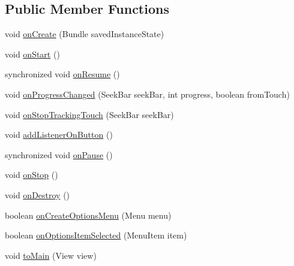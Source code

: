 \subsection*{Public Member Functions}
\begin{DoxyCompactItemize}
\item 
void \hyperlink{classcom_1_1example_1_1android_1_1_bluetooth_chat_1_1_l_a_s_a_r_control_a85e87cb5ced88dff7c8173ecc4f636d1}{on\-Create} (Bundle saved\-Instance\-State)
\item 
void \hyperlink{classcom_1_1example_1_1android_1_1_bluetooth_chat_1_1_l_a_s_a_r_control_a11bcf4e3177fdb549350a4aa149e9e67}{on\-Start} ()
\item 
synchronized void \hyperlink{classcom_1_1example_1_1android_1_1_bluetooth_chat_1_1_l_a_s_a_r_control_a45b78fc913c5af291d89fd7e5a8aa601}{on\-Resume} ()
\item 
void \hyperlink{classcom_1_1example_1_1android_1_1_bluetooth_chat_1_1_l_a_s_a_r_control_ac98847d21be8b44457423bb004e2e655}{on\-Progress\-Changed} (Seek\-Bar seek\-Bar, int progress, boolean from\-Touch)
\item 
void \hyperlink{classcom_1_1example_1_1android_1_1_bluetooth_chat_1_1_l_a_s_a_r_control_abb13b75125cb8cb24fbeeef2451e262c}{on\-Stop\-Tracking\-Touch} (Seek\-Bar seek\-Bar)
\item 
void \hyperlink{classcom_1_1example_1_1android_1_1_bluetooth_chat_1_1_l_a_s_a_r_control_ae52c93cc72458772ce286f19d7cb6760}{add\-Listener\-On\-Button} ()
\item 
synchronized void \hyperlink{classcom_1_1example_1_1android_1_1_bluetooth_chat_1_1_l_a_s_a_r_control_a0e46f04a72924962b5bdb1e5aff7ddc4}{on\-Pause} ()
\item 
void \hyperlink{classcom_1_1example_1_1android_1_1_bluetooth_chat_1_1_l_a_s_a_r_control_a458397229d0b2076a739955b1cb8be35}{on\-Stop} ()
\item 
void \hyperlink{classcom_1_1example_1_1android_1_1_bluetooth_chat_1_1_l_a_s_a_r_control_a8a744b43949a3939f448facad211e3d2}{on\-Destroy} ()
\item 
boolean \hyperlink{classcom_1_1example_1_1android_1_1_bluetooth_chat_1_1_l_a_s_a_r_control_a8f7d87763ddaf085205a54e8477ecfce}{on\-Create\-Options\-Menu} (Menu menu)
\item 
boolean \hyperlink{classcom_1_1example_1_1android_1_1_bluetooth_chat_1_1_l_a_s_a_r_control_a37a55c533c74b60c0290ef1329d74e65}{on\-Options\-Item\-Selected} (Menu\-Item item)
\item 
void \hyperlink{classcom_1_1example_1_1android_1_1_bluetooth_chat_1_1_l_a_s_a_r_control_a1f166dbb18c9970efc1bc01b9b2e5c54}{to\-Main} (View view)

\end{DoxyCompactItemize}
